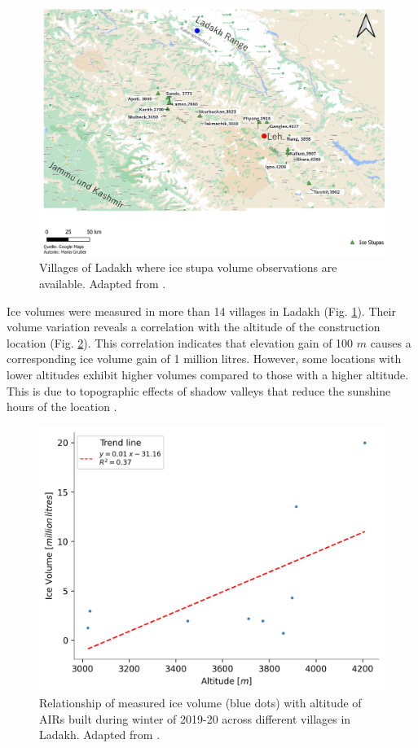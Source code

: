 \begin{figure}
	\includegraphics[width=\textwidth]{figs/ISC_villages}
	\caption{Villages of Ladakh where ice stupa volume observations are available. Adapted from \citet{mariagruberIceStupasLadakh2022}.}
	\label{fig:villages}
\end{figure}

Ice volumes were measured in more than 14 villages in Ladakh (Fig. \ref{fig:villages}). Their volume variation
reveals a correlation with the altitude of the construction location (Fig. \ref{fig:altvsvol}). This correlation
indicates that elevation gain of 100 $m$ causes a corresponding ice volume gain of 1 million litres. However,
some locations with lower altitudes exhibit higher volumes compared to those with a higher altitude. This is due
to topographic effects of shadow valleys that reduce the sunshine hours of the location
\citep{mariagruberIceStupasLadakh2022}.

\begin{figure}
	\centering
	\includegraphics[width=\textwidth]{figs/altitudevsvolume.png}
	\caption{Relationship of measured ice volume (blue dots) with altitude of \ac{AIRs} built during winter of 2019-20 across
		different villages in Ladakh. Adapted from \citet{mariagruberIceStupasLadakh2022}.}
	\label{fig:altvsvol}
\end{figure}

